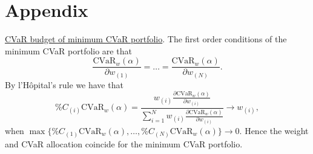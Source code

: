 \documentclass[12pt,a4paper]{article}
\begin{document}
\newpage

\section{Appendix \label{sec:Appendix}}

\noindent \underline{CVaR budget of minimum CVaR portfolio}.
The first order conditions of the minimum CVaR portfolio are that
\begin{equation} \frac{ \mbox{CVaR}_w(\alpha)}{\partial w_{(1)}} = \ldots = \frac{ \mbox{CVaR}_w(\alpha)}{\partial w_{(N)}} .\end{equation}
By l'H\^{o}pital's rule we have that
\begin{equation} \%C_{(i)} \mbox{CVaR}_w(\alpha) = \frac{w_{(i)} \frac{\partial\mbox{CVaR}_w(\alpha) }{\partial w_{(i)}}}{\sum_{i=1}^N w_{(i)}\frac{\partial\mbox{CVaR}_w(\alpha) }{\partial w_{(i)}}}
\to w_{(i)},\end{equation} when $\max\{ \%C_{(1)}\mbox{CVaR}_w(\alpha) , \ldots ,  \%C_{(N)}\mbox{CVaR}_w(\alpha) \} \to 0.$ Hence the weight and CVaR allocation coincide for the minimum CVaR portfolio.










\end{document}
